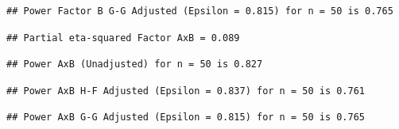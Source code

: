 \documentclass[]{book}
\begin{document}
\begin{verbatim}
## Power Factor B G-G Adjusted (Epsilon = 0.815) for n = 50 is 0.765
\end{verbatim}

\begin{verbatim}
## Partial eta-squared Factor AxB = 0.089
\end{verbatim}

\begin{verbatim}
## Power AxB (Unadjusted) for n = 50 is 0.827
\end{verbatim}

\begin{verbatim}
## Power AxB H-F Adjusted (Epsilon = 0.837) for n = 50 is 0.761
\end{verbatim}

\begin{verbatim}
## Power AxB G-G Adjusted (Epsilon = 0.815) for n = 50 is 0.765
\end{verbatim}


\end{document}
